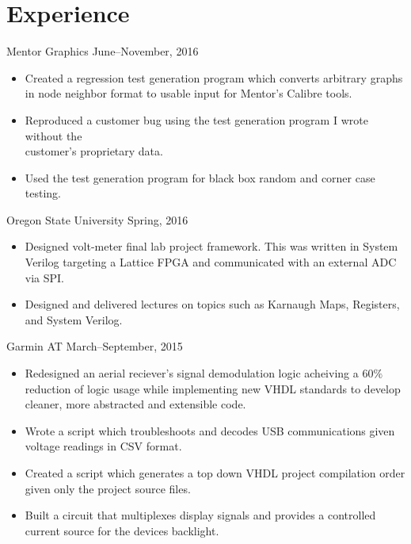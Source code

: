 \documentclass[]{friggeri-cv}
\begin{document}
\section{Experience}

         {Mentor Graphics}
         {June--November, 2016}
         \begin{itemize}
           \item Created a regression test generation program which converts arbitrary 
                 graphs in node neighbor format to usable input for Mentor's Calibre tools.
           \item Reproduced a customer bug using the test generation program I wrote
                 without the \\ customer's proprietary data.
           \item Used the test generation program for black box random and corner case testing.
        \end{itemize}

         {Oregon State University}
         {Spring, 2016}
         \begin{itemize}
           \item Designed volt-meter final lab project framework. This was written in 
                 System Verilog targeting a Lattice FPGA and communicated with an 
                 external ADC via SPI.
           \item Designed and delivered lectures on topics such as Karnaugh Maps, Registers,
                 and System Verilog.
         \end{itemize}

         {Garmin AT}
         {March--September, 2015}
         \begin{itemize}
           \item Redesigned an aerial reciever's signal demodulation logic acheiving a 
                 $60\%$ reduction of logic usage while implementing new VHDL 
                 standards to develop cleaner, more abstracted and extensible code.
           \item Wrote a script which troubleshoots and decodes USB communications given 
                 voltage readings in CSV format.
           \item Created a script which generates a top down VHDL project compilation order 
                 given only the project source files.
           \item Built a circuit that multiplexes display signals and provides
                 a controlled current source for the devices backlight.
         \end{itemize}
\end{document}
